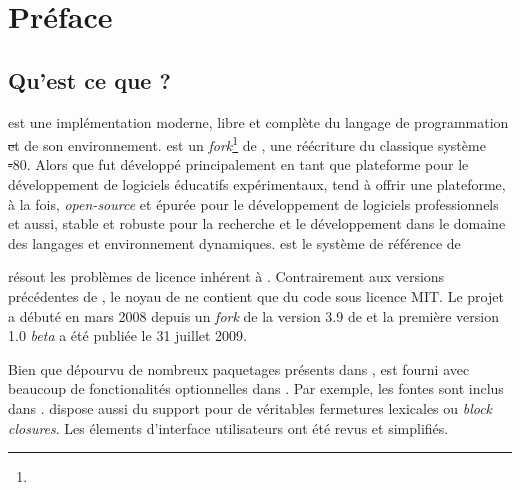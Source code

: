 \documentclass[a4paper,10pt,twoside]{book}
\begin{document}
    \sloppy
    \frontmatter
\fi
\renewcommand{\nnbb}[2]{} %
\sloppy
\chapter{Préface}

\section*{Qu'est ce que \pharo?}

\pharo est une implémentation moderne, libre et complète du
langage de programmation \st et de son environnement. \pharo est
un \emph{fork}\footnote{} de \squeak\cite{Inga97a}, 
une réécriture du classique système \st-80. 
Alors que \squeak fut développé principalement en tant que
plateforme pour le développement de logiciels éducatifs
expérimentaux, \pharo tend à offrir une plateforme,
à la fois, \emph{open-source} et épurée pour le développement de
logiciels professionnels et aussi, stable et robuste pour la recherche 
et le développement dans le domaine des langages et environnement dynamiques. 
\pharo est le système de référence de  %

\pharo résout les problèmes de licence inhérent à \squeak. 
Contrairement aux versions précédentes de \squeak, le noyau
de \pharo ne contient que du code sous licence MIT. Le projet \pharo
a débuté en mars 2008 depuis un \emph{fork} de la version 3.9 de \squeak et la première version 1.0 \emph{beta} a été publiée le
31 juillet 2009. %

Bien que dépourvu de nombreux paquetages présents dans \squeak, \pharo
est fourni avec beaucoup de fonctionalités optionnelles dans \squeak.
Par exemple, les fontes \truetype sont inclus dans \pharo. \pharo
dispose aussi du support pour de véritables fermetures lexicales ou
\emph{block closures}. Les élements d'interface utilisateurs ont été
revus et simplifiés. %
\end{document}

